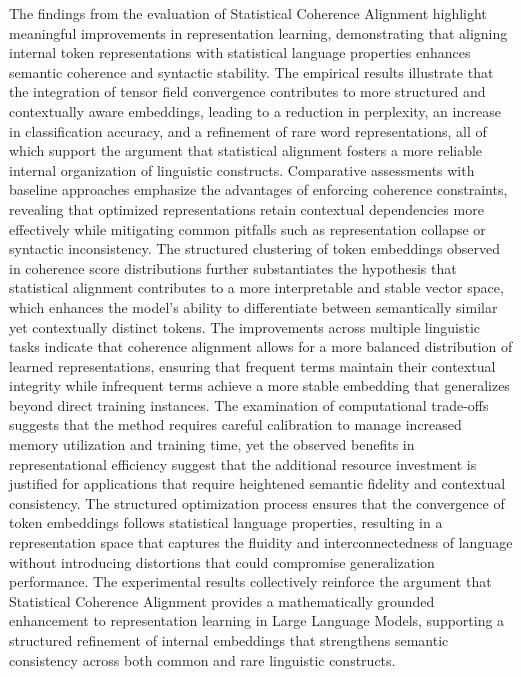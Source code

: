 \documentclass{article}
\begin{document}
The findings from the evaluation of Statistical Coherence Alignment highlight meaningful improvements in representation learning, demonstrating that aligning internal token representations with statistical language properties enhances semantic coherence and syntactic stability. The empirical results illustrate that the integration of tensor field convergence contributes to more structured and contextually aware embeddings, leading to a reduction in perplexity, an increase in classification accuracy, and a refinement of rare word representations, all of which support the argument that statistical alignment fosters a more reliable internal organization of linguistic constructs. Comparative assessments with baseline approaches emphasize the advantages of enforcing coherence constraints, revealing that optimized representations retain contextual dependencies more effectively while mitigating common pitfalls such as representation collapse or syntactic inconsistency. The structured clustering of token embeddings observed in coherence score distributions further substantiates the hypothesis that statistical alignment contributes to a more interpretable and stable vector space, which enhances the model’s ability to differentiate between semantically similar yet contextually distinct tokens. The improvements across multiple linguistic tasks indicate that coherence alignment allows for a more balanced distribution of learned representations, ensuring that frequent terms maintain their contextual integrity while infrequent terms achieve a more stable embedding that generalizes beyond direct training instances. The examination of computational trade-offs suggests that the method requires careful calibration to manage increased memory utilization and training time, yet the observed benefits in representational efficiency suggest that the additional resource investment is justified for applications that require heightened semantic fidelity and contextual consistency. The structured optimization process ensures that the convergence of token embeddings follows statistical language properties, resulting in a representation space that captures the fluidity and interconnectedness of language without introducing distortions that could compromise generalization performance. The experimental results collectively reinforce the argument that Statistical Coherence Alignment provides a mathematically grounded enhancement to representation learning in Large Language Models, supporting a structured refinement of internal embeddings that strengthens semantic consistency across both common and rare linguistic constructs.



\end{document}
